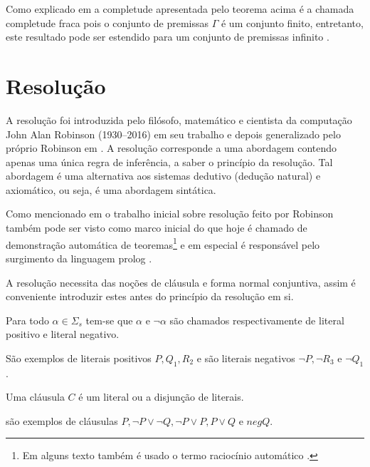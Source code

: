 Como explicado em \cite{joaoPavao2014} a completude apresentada pelo teorema acima é a chamada completude fraca pois o conjunto de premissas $\Gamma$ é um conjunto finito, entretanto, este resultado pode ser estendido para um conjunto de premissas infinito \cite{joaoPavao2014}.

\section{Resolução}

A resolução foi introduzida pelo filósofo, matemático e cientista da computação John Alan Robinson (1930--2016) em seu trabalho \cite{robinson1965} e depois generalizado pelo próprio Robinson em \cite{robinson1983}. A resolução corresponde a uma abordagem contendo apenas uma única regra de inferência, a saber o princípio da resolução. Tal abordagem é uma alternativa aos sistemas dedutivo (dedução natural) e axiomático, ou seja, é uma abordagem sintática.

Como mencionado em \cite{joaoPavao2014} o trabalho inicial sobre resolução feito por Robinson também pode ser visto como marco inicial do que hoje é chamado de demonstração automática de teoremas\footnote{Em alguns texto também é usado o termo raciocínio automático \cite{robinson2001}.} e em especial é responsável pelo surgimento da linguagem prolog \cite{ayala2014}.

A resolução necessita das noções de cláusula e forma normal conjuntiva, assim é conveniente introduzir estes antes do princípio da resolução em si.

\begin{definition}[Literais]\label{def:Literais}
    Para todo $\alpha \in \Sigma_s$ tem-se que $\alpha$ e $\neg \alpha$ são chamados respectivamente de literal positivo e literal negativo.
\end{definition}

\begin{exem}
    São exemplos de literais positivos $P, Q_1, R_2$ e são literais negativos $\neg P, \neg R_3$ e $\neg Q_1$.
\end{exem}

\begin{definition}[cláusula]\label{def:cláusula}
    Uma cláusula $C$ é um literal ou a disjunção de literais.
\end{definition}

\begin{exem}
    são exemplos de cláusulas $P, \neg P \lor \neg Q, \neg P \lor P, P \lor Q$ e $neg Q$.
\end{exem}

